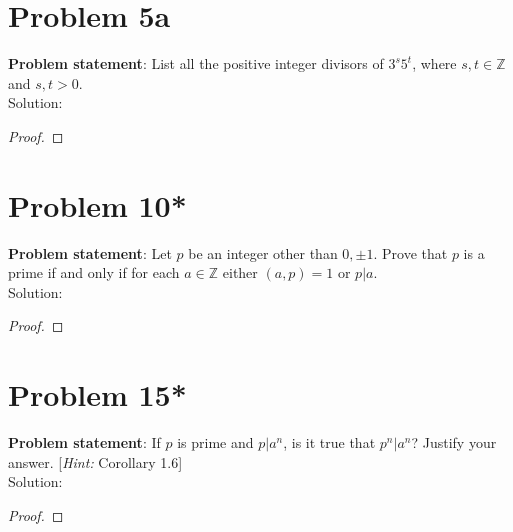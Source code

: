 \documentclass{article} %
\begin{document}
\newpage

\section*{Problem 5a}


\textbf{Problem statement}: List all the positive integer divisors of $3^s5^t$, where $s, t \in \mathbb{Z}$ and $s, t > 0$.
\\

Solution: 
\begin{addmargin}[1em]{0em}
\begin{proof}

\end{proof}
\end{addmargin}

\newpage

\section*{Problem 10*}


\textbf{Problem statement}: Let $p$ be an integer other than $0, \pm 1$.  Prove that $p$ is a prime if and only if for each $a \in \mathbb{Z}$ either $(a,p) = 1$ or $p|a$.
\\

Solution: 
\begin{addmargin}[1em]{0em}
\begin{proof}

\end{proof}
\end{addmargin}

\newpage

\section*{Problem 15*}


\textbf{Problem statement}: If $p$ is prime and $p|a^n$, is it true that $p^n|a^n$?  Justify your answer. [\textit{Hint:} Corollary 1.6]
\\

Solution: 
\begin{addmargin}[1em]{0em}
\begin{proof}

\end{proof}
\end{addmargin}
\end{document}
